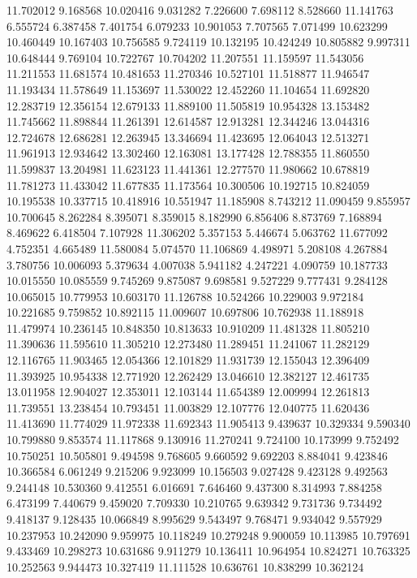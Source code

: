 11.702012
9.168568
10.020416
9.031282
7.226600
7.698112
8.528660
11.141763
6.555724
6.387458
7.401754
6.079233
10.901053
7.707565
7.071499
10.623299
10.460449
10.167403
10.756585
9.724119
10.132195
10.424249
10.805882
9.997311
10.648444
9.769104
10.722767
10.704202
11.207551
11.159597
11.543056
11.211553
11.681574
10.481653
11.270346
10.527101
11.518877
11.946547
11.193434
11.578649
11.153697
11.530022
12.452260
11.104654
11.692820
12.283719
12.356154
12.679133
11.889100
11.505819
10.954328
13.153482
11.745662
11.898844
11.261391
12.614587
12.913281
12.344246
13.044316
12.724678
12.686281
12.263945
13.346694
11.423695
12.064043
12.513271
11.961913
12.934642
13.302460
12.163081
13.177428
12.788355
11.860550
11.599837
13.204981
11.623123
11.441361
12.277570
11.980662
10.678819
11.781273
11.433042
11.677835
11.173564
10.300506
10.192715
10.824059
10.195538
10.337715
10.418916
10.551947
11.185908
8.743212
11.090459
9.855957
10.700645
8.262284
8.395071
8.359015
8.182990
6.856406
8.873769
7.168894
8.469622
6.418504
7.107928
11.306202
5.357153
5.446674
5.063762
11.677092
4.752351
4.665489
11.580084
5.074570
11.106869
4.498971
5.208108
4.267884
3.780756
10.006093
5.379634
4.007038
5.941182
4.247221
4.090759
10.187733
10.015550
10.085559
9.745269
9.875087
9.698581
9.527229
9.777431
9.284128
10.065015
10.779953
10.603170
11.126788
10.524266
10.229003
9.972184
10.221685
9.759852
10.892115
11.009607
10.697806
10.762938
11.188918
11.479974
10.236145
10.848350
10.813633
10.910209
11.481328
11.805210
11.390636
11.595610
11.305210
12.273480
11.289451
11.241067
11.282129
12.116765
11.903465
12.054366
12.101829
11.931739
12.155043
12.396409
11.393925
10.954338
12.771920
12.262429
13.046610
12.382127
12.461735
13.011958
12.904027
12.353011
12.103144
11.654389
12.009994
12.261813
11.739551
13.238454
10.793451
11.003829
12.107776
12.040775
11.620436
11.413690
11.774029
11.972338
11.692343
11.905413
9.439637
10.329334
9.590340
10.799880
9.853574
11.117868
9.130916
11.270241
9.724100
10.173999
9.752492
10.750251
10.505801
9.494598
9.768605
9.660592
9.692203
8.884041
9.423846
10.366584
6.061249
9.215206
9.923099
10.156503
9.027428
9.423128
9.492563
9.244148
10.530360
9.412551
6.016691
7.646460
9.437300
8.314993
7.884258
6.473199
7.440679
9.459020
7.709330
10.210765
9.639342
9.731736
9.734492
9.418137
9.128435
10.066849
8.995629
9.543497
9.768471
9.934042
9.557929
10.237953
10.242090
9.959975
10.118249
10.279248
9.900059
10.113985
10.797691
9.433469
10.298273
10.631686
9.911279
10.136411
10.964954
10.824271
10.763325
10.252563
9.944473
10.327419
11.111528
10.636761
10.838299
10.362124
